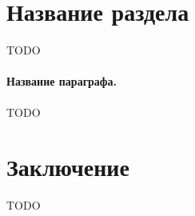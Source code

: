 \documentclass[12pt,twoside]{article}
\begin{document}
\section{Название раздела}
TODO

\paragraph{Название параграфа.}
TODO

\section{Заключение}
TODO





\end{document}
